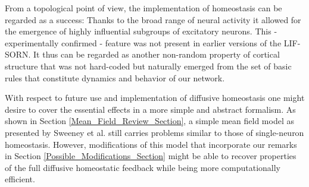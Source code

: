 \documentclass[10pt,a4paper]{article}
\begin{document}
From a topological point of view, the implementation of homeostasis can be regarded as a success: Thanks to the broad range of neural activity it allowed for the emergence of highly influential subgroups of excitatory neurons. This - experimentally confirmed - feature was not present in earlier versions of the LIF-SORN. It thus can be regarded as another non-random property of cortical structure that was not hard-coded but naturally emerged from the set of basic rules that constitute dynamics and behavior of our network.

With respect to future use and implementation of diffusive homeostasis one might desire to cover the essential effects in a more simple and abstract formalism. As shown in Section \ref{Mean_Field_Review_Section}, a simple mean field model as presented by Sweeney et al. still carries problems similar to those of single-neuron homeostasis. However, modifications of this model that incorporate our remarks in Section \ref{Possible_Modifications_Section} might be able to recover properties of the full diffusive homeostatic feedback while being more computationally efficient.   

\clearpage


\end{document}
